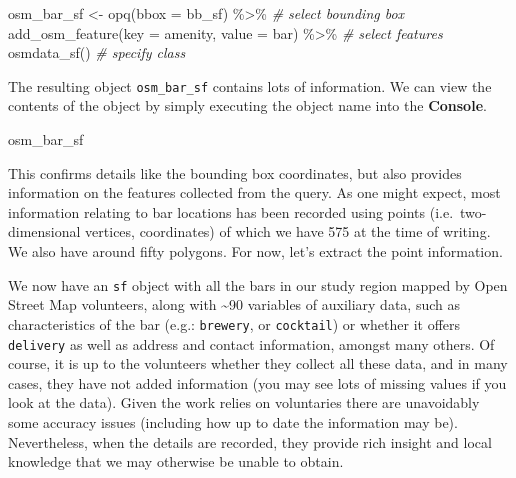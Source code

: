 \documentclass[
]{book}
\makeatletter
\newenvironment{Shaded}{\begin{snugshade}}{\end{snugshade}}
\newcommand{\AttributeTok}[1]{\textcolor[rgb]{0.61,0.61,0.61}{#1}}
\newcommand{\CommentTok}[1]{\textcolor[rgb]{0.37,0.37,0.37}{\textit{#1}}}
\newcommand{\FunctionTok}[1]{\textcolor[rgb]{0,0,0}{#1}}
\newcommand{\NormalTok}[1]{#1}
\newcommand{\OtherTok}[1]{\textcolor[rgb]{0.37,0.37,0.37}{#1}}
\newcommand{\SpecialCharTok}[1]{\textcolor[rgb]{0,0,0}{#1}}
\newcommand{\StringTok}[1]{\textcolor[rgb]{0.5,0.5,0.5}{#1}}
\newenvironment{kframe}{%
\medskip{}
\setlength{\fboxsep}{.8em}
 \def\at@end@of@kframe{}%
 \ifinner\ifhmode%
  \def\at@end@of@kframe{\end{minipage}}%
  \begin{minipage}{\columnwidth}%
 \fi\fi%
 \def\FrameCommand##1{\hskip\@totalleftmargin \hskip-\fboxsep
 \colorbox{shadecolor}{##1}\hskip-\fboxsep
     \hskip-\linewidth \hskip-\@totalleftmargin \hskip\columnwidth}%
 \MakeFramed {\advance\hsize-\width
   \@totalleftmargin\z@ \linewidth\hsize
   \@setminipage}}%
 {\par\unskip\endMakeFramed%
 \at@end@of@kframe}
\renewenvironment{Shaded}{\begin{kframe}}{\end{kframe}}
\makeatother
\begin{document}
\begin{Shaded}
\begin{Highlighting}[]
\NormalTok{osm\_bar\_sf }\OtherTok{\textless{}{-}} \FunctionTok{opq}\NormalTok{(}\AttributeTok{bbox =}\NormalTok{ bb\_sf) }\SpecialCharTok{\%\textgreater{}\%}    \CommentTok{\# select bounding box}
  \FunctionTok{add\_osm\_feature}\NormalTok{(}\AttributeTok{key =} \StringTok{\textquotesingle{}amenity\textquotesingle{}}\NormalTok{, }\AttributeTok{value =} \StringTok{\textquotesingle{}bar\textquotesingle{}}\NormalTok{) }\SpecialCharTok{\%\textgreater{}\%} \CommentTok{\# select features}
  \FunctionTok{osmdata\_sf}\NormalTok{()          }\CommentTok{\# specify class}
\end{Highlighting}
\end{Shaded}

The resulting object \texttt{osm\_bar\_sf} contains lots of information. We can view the contents of the object by simply executing the object name into the \textbf{Console}.

\begin{Shaded}
\begin{Highlighting}[]
\NormalTok{osm\_bar\_sf}
\end{Highlighting}
\end{Shaded}

This confirms details like the bounding box coordinates, but also provides information on the features collected from the query. As one might expect, most information relating to bar locations has been recorded using points (i.e.~two-dimensional vertices, coordinates) of which we have 575 at the time of writing. We also have around fifty polygons. For now, let's extract the point information.

\begin{Shaded}
\end{Shaded}

We now have an \texttt{sf} object with all the bars in our study region mapped by Open Street Map volunteers, along with \textasciitilde90 variables of auxiliary data, such as characteristics of the bar (e.g.: \texttt{brewery}, or \texttt{cocktail}) or whether it offers \texttt{delivery} as well as address and contact information, amongst many others. Of course, it is up to the volunteers whether they collect all these data, and in many cases, they have not added information (you may see lots of missing values if you look at the data). Given the work relies on voluntaries there are unavoidably some accuracy issues (including how up to date the information may be). Nevertheless, when the details are recorded, they provide rich insight and local knowledge that we may otherwise be unable to obtain.
\end{document}

